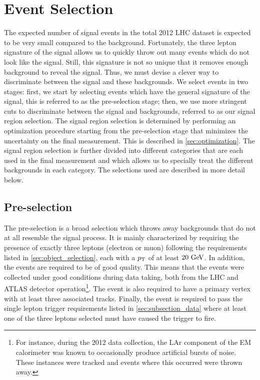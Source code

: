 \section{Event Selection}
\label{sec:event_selection}

The expected number of signal events in the total 2012 LHC 
dataset is expected to be very small compared to the background. %
Fortunately, the three lepton signature of the signal allows us to
quickly throw out many events which do not look like the signal.
Still, this signature is not so unique that 
it removes enough background 
to reveal the signal. 
Thus, we must devise a clever way to discriminate 
between the signal and these backgrounds. We select
events in two stages: first, we start
by selecting events which have the general signature of the signal, 
this is referred to as the pre-selection stage; then, we
use more stringent cuts to discriminate between the signal and backgrounds, 
referred to as our signal region selection.
The signal region selection is determined by performing an 
optimization procedure starting from the pre-selection stage 
that minimizes the uncertainty
on the final measurement.  This is described in \sec\ref{sec:optimization}.
The signal region selection is further divided into different
categories that are each used in the final measurement
and which allows us to specially treat the different backgrounds
in each category.  
The selections used are described in more detail below.




\subsection{Pre-selection}
\label{sec:preselection}

The pre-selection is a broad selection which throws
away backgrounds that do not at all resemble the signal process.
It is mainly characterized by requiring the presence of exactly three leptons
(electron or muon) following the requirements listed in 
\sec\ref{sec:object_selection}, each with a $p_{\mathrm{T}}$ of at least $20\GeV$.
In addition, the events are required to be of good quality. This means
that the events were collected under good conditions during data taking,
both from the LHC and ATLAS detector operation\footnote{For instance,
during the 2012 data collection, the LAr component of the EM calorimeter
was known to occasionally produce artificial bursts of noise. These instances
were tracked and events where this occurred were thrown away.}. The event is 
also required to have a primary vertex with at least three associated tracks.
Finally, the event is required to pass the single lepton trigger
requirements listed in \sec\ref{sec:subsection_data} where 
at least one of the three leptons selected must have caused the trigger to fire.



